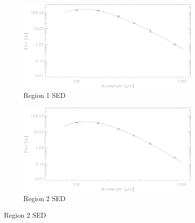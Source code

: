 \begin{figure}
  \centering
  \begin{subfigure}[t]{.48\textwidth}
    \centering
    \includegraphics[width=1.\linewidth]{sed_imgs/region_1beta_20_SED_fit.eps}
    \caption{Region 1 SED}
  \end{subfigure}
  \quad
  \begin{subfigure}[t]{.48\textwidth}
    \centering
    \includegraphics[width=1.\linewidth]{sed_imgs/region_2beta_23_SED_fit.eps}
    \caption{Region 2 SED}
  \end{subfigure}
  

\end{figure}
